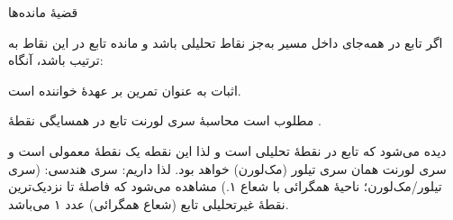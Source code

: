 \EMhold


\begin{EMtheorem}{قضیهٔ مانده‌ها}

اگر تابع  در همه‌جای داخل مسیر  به‌جز نقاط  تحلیلی باشد و مانده تابع در این نقاط به ترتیب  باشد، آنگاه:

\end{EMtheorem}

\begin{EMunit}


\end{EMunit}

اثبات به عنوان تمرین بر عهدهٔ خواننده است.

\EMhold


\begin{EMexample}{}

مطلوب است محاسبهٔ سری لورنت تابع  در همسایگی نقطهٔ .

دیده می‌شود که تابع  در نقطهٔ  تحلیلی است و لذا این نقطه یک نقطهٔ معمولی است و سری لورنت همان سری تیلور (مک‌لورن) خواهد بود. لذا داریم:
سری هندسی:
(سری تیلور/مک‌لورن؛ ناحیهٔ همگرائی با شعاع ۱.)
مشاهده می‌شود که فاصلهٔ  تا نزدیک‌ترین نقطهٔ غیرتحلیلی تابع (شعاع همگرائی) عدد ۱ می‌باشد.

\end{EMexample}

\begin{EMunit}


\end{EMunit}

